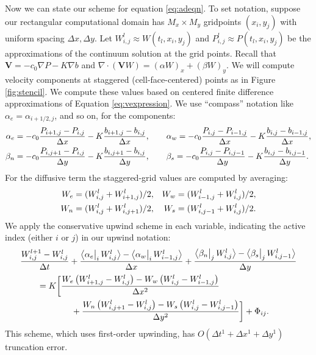 \documentclass[11pt,final]{amsart}%
\newcommand\bV{\mathbf{V}}
\newcommand{\Div}{\nabla\cdot}
\newcommand{\grad}{\nabla}
\newcommand{\Wlij}{W^l_{i,j}}
\newcommand{\Plij}{P^l_{i,j}}
\newcommand{\upp}[3]{\big<#1\big|_{#3}\,#2\big>}
\begin{document}
Now we can state our scheme for equation \eqref{eq:adeqn}.  To set notation, suppose our rectangular computational domain has $M_x \times M_y$ gridpoints $(x_i,y_j)$ with uniform spacing $\Delta x,\Delta y$.  Let $\Wlij \approx W(t_l,x_i,y_j)$ and $\Plij \approx P(t_l,x_i,y_j)$ be the approximations of the continuum solution at the grid points.  Recall that $\bV = - c_0 \grad P - K \grad b$ and $\Div \left(\bV W\right) = (\alpha W)_x + (\beta W)_y$.  We will compute velocity components at staggered (cell-face-centered) points as in Figure \ref{fig:stencil}.  We compute these values based on centered finite difference approximations of Equation \eqref{eq:vexpression}.  We use ``compass'' notation like $\alpha_e = \alpha_{i+1/2,j}$, and so on, for the components:
\begin{align}
\alpha_e &= - c_0 \frac{P_{i+1,j}-P_{i,j}}{\Delta x} - K \frac{b_{i+1,j}-b_{i,j}}{\Delta x}, \qquad \alpha_w = - c_0 \frac{P_{i,j}-P_{i-1,j}}{\Delta x} - K \frac{b_{i,j}-b_{i-1,j}}{\Delta x}, \label{eq:velocitycomp} \\
\beta_n  &= - c_0 \frac{P_{i,j+1}-P_{i,j}}{\Delta y} - K \frac{b_{i,j+1}-b_{i,j}}{\Delta y}, \qquad \beta_s = - c_0 \frac{P_{i,j}-P_{i,j-1}}{\Delta y} - K \frac{b_{i,j}-b_{i,j-1}}{\Delta y}. \notag
\end{align}
For the diffusive term the staggered-grid values are computed by averaging:
\begin{align}
W_e &= (W_{i,j}^l + W_{i+1,j}^l)/2, & W_w &= (W_{i-1,j}^l + W_{i,j}^l)/2, \label{eq:stagW} \\
W_n &= (W_{i,j}^l + W_{i,j+1}^l)/2, & W_s &= (W_{i,j-1}^l + W_{i,j}^l)/2. \notag
\end{align}
We apply the conservative upwind scheme in each variable, indicating the active index (either $i$ or $j$) in our upwind notation:
\begin{align}
 &\frac{W_{i,j}^{l+1} - \Wlij}{\Delta t} + \frac{\upp{\alpha_e}{\Wlij}{i} - \upp{\alpha_w}{W_{i-1,j}^l}{i}}{\Delta x} + \frac{\upp{\beta_n}{\Wlij}{j} - \upp{\beta_s}{W_{i,j-1}^l}{j}}{\Delta y}  \label{eq:Wfd} \\
      &\qquad = K \bigg[\frac{W_e \left(W_{i+1,j}^l - \Wlij\right) - W_w \left(\Wlij - W_{i-1,j}^l\right)}{\Delta x^2}  \notag \\
      &\qquad\qquad\qquad + \frac{W_n \left(W_{i,j+1}^l - \Wlij\right) - W_s \left(\Wlij - W_{i,j-1}^l\right)}{\Delta y^2}\bigg] + \Phi_{ij}. \notag
\end{align}
This scheme, which uses first-order upwinding, has $O(\Delta t^1 + \Delta x^1 + \Delta y^1)$ truncation error.
\end{document}
